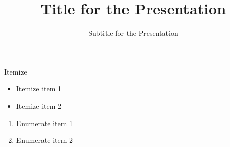 \documentclass[aspectratio=169]{beamer}
\title{Title for the Presentation}
\subtitle{Subtitle for the Presentation}
\begin{document}
\frame{\maketitle}

\begin{frame}{Itemize}
    \begin{itemize}
        \item Itemize item 1
        \item Itemize item 2
    \end{itemize}
    \begin{enumerate}
        \item Enumerate item 1
        \item Enumerate item 2
    \end{enumerate}
\end{frame}
\end{document}
